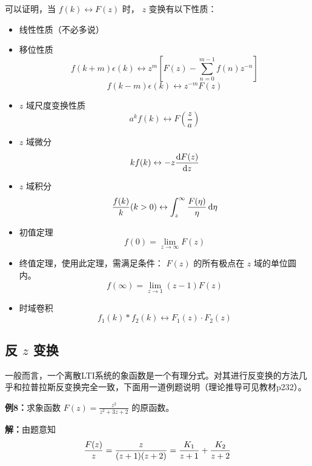 \documentclass[UTF8,a4paper,11pt]{article}
\begin{document}
可以证明，当 $f(k)\leftrightarrow F(z)$ 时， $z$ 变换有以下性质：
\begin{itemize}
\item 线性性质（不必多说）
\item 移位性质
\begin{equation}
f(k+m)\epsilon(k)\leftrightarrow z^m[F(z)-\sum_{n=0}^{m-1} f(n)z^{-n}]
\end{equation}
\begin{equation}
f(k-m)\epsilon(k)\leftrightarrow z^{-m}F(z)
\end{equation}
\item $z$ 域尺度变换性质
\begin{equation}
a^kf(k)\leftrightarrow F(\frac{z}{a})
\end{equation}
\item $z$ 域微分
\begin{equation}
kf(k)\leftrightarrow -z\frac{{\rm d}F(z)}{{\rm d}z}
\end{equation}
\item $z$ 域积分
\begin{equation}
\frac{f(k)}{k}(k>0)\leftrightarrow \int_z^{\infty} {\frac{F(\eta)}{\eta}} \,{\rm d}\eta
\end{equation}
\item 初值定理
\begin{equation}
f(0)=\lim_{z \to \infty}F(z)
\end{equation}
\item 终值定理，使用此定理，需满足条件： $F(z)$ 的所有极点在 $z$ 域的单位圆内。
\begin{equation}
f(\infty)=\lim_{z \to 1}(z-1)F(z)
\end{equation}
\item 时域卷积
\begin{equation}
f_1(k)*f_2(k)\leftrightarrow F_1(z)\cdot F_2(z)
\end{equation}
\end{itemize} 

\subsection{反 $z$ 变换}
一般而言，一个离散LTI系统的象函数是一个有理分式。对其进行反变换的方法几乎和拉普拉斯反变换完全一致，下面用一道例题说明（理论推导可见教材p232）。

\textbf{例8：}求象函数 $F(z)=\frac{z^2}{z^2+3z+2}$ 的原函数。

\textbf{解：}由题意知
\begin{equation}
\frac{F(z)}{z}=\frac{z}{(z+1)(z+2)}=\frac{K_1}{z+1}+\frac{K_2}{z+2}
\notag
\end{equation}
\end{document}
